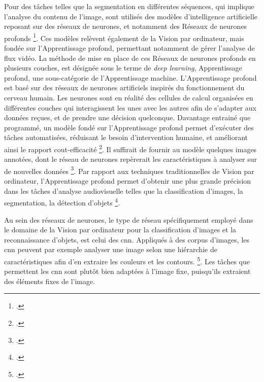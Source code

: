 Pour des tâches telles que la segmentation en différentes séquences, qui implique l’analyse du contenu de l’image, sont utilisés des modèles d’intelligence artificielle reposant sur des réseaux de neurones, et notamment des \gls{Réseaux de neurones profonds} \footcite{norindr2023}. Ces modèles relèvent également de la \gls{Vision par ordinateur}, mais fondée sur l'\gls{Apprentissage profond}, permettant notamment de gérer l'analyse de flux vidéo. La méthode de mise en place de ces \gls{Réseaux de neurones profonds} en plusieurs couches, est désignée sous le terme de \textit{deep learning}, \gls{Apprentissage profond}, une sous-catégorie de l'\gls{Apprentissage machine}. L'\gls{Apprentissage profond} est basé sur des réseaux de neurones artificiels inspirés du fonctionnement du cerveau humain. Les neurones sont en réalité des cellules de calcul organisées en différentes couches qui interagissent les unes avec les autres afin de s’adapter aux données reçues, et de prendre une décision quelconque. Davantage entrainé que programmé, un modèle fondé sur l’\gls{Apprentissage profond} permet d’exécuter des tâches automatisées, réduisant le besoin d'intervention humaine, et améliorant ainsi le rapport cout-efficacité \footcite{mahony2020}. Il suffirait de fournir au modèle quelques images annotées, dont le réseau de neurones repèrerait les caractéristiques à analyser sur de nouvelles données \footcite{mahony2020}. Par rapport aux techniques traditionnelles de \gls{Vision par ordinateur}, l'\gls{Apprentissage profond} permet d’obtenir une plus grande précision dans les tâches d'analyse audiovisuelle telles que la classification d'images, la segmentation, la détection d'objets \footcite{mahony2020}.

Au sein des réseaux de neurones, le type de réseau spécifiquement employé dans le domaine de la \gls{Vision par ordinateur} pour la classification d’images et la reconnaissance d’objets, est celui des \gls{cnn}. Appliqués à des corpus d’images, les \gls{cnn} peuvent par exemple analyser une image selon une hiérarchie de caractéristiques afin d’en extraire les couleurs et les contours. \footcite{brachmann2017}. Les tâches que permettent les \gls{cnn} sont plutôt bien adaptées à l’image fixe, puisqu’ils extraient des éléments fixes de l’image.  

